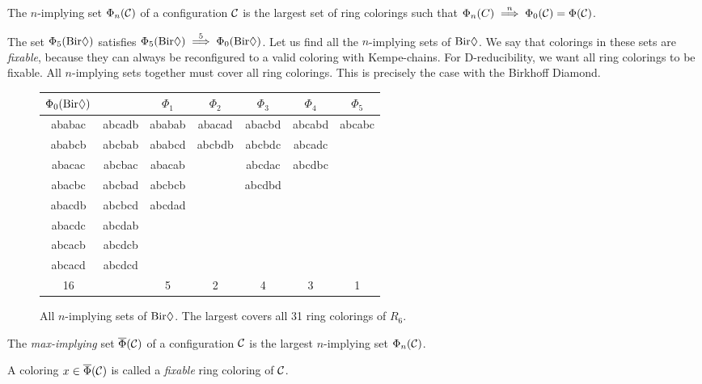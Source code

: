 \begin{definition}
    The $n$-implying set $\Phi_n(\mathcal{C})$ of a configuration $\mathcal{C}$ is the largest set of ring colorings such that $\Phi_n(C) \stackrel{n}{\implies} \Phi_0(\mathcal{C}) = \Phi(\mathcal{C})$. 
\end{definition}

The set $\Phi_5(\text{Bir}\Diamond)$ satisfies $\Phi_5(\text{Bir}\Diamond) \stackrel{5}{\implies} \Phi_0(\text{Bir}\Diamond)$. Let us find all the $n$-implying sets of $\text{Bir}\Diamond$. We say that colorings in these sets are \textit{fixable}, because they can always be reconfigured to a valid coloring with Kempe-chains. For D-reducibility, we want all ring colorings to be fixable. All $n$-implying sets together must cover all ring colorings. This is precisely the case with the Birkhoff Diamond.

\needspace{2cm}
\begin{figure}[!ht]
    \centering
    \begin{tabular}{ ccccccc }
        $\Phi_0(\text{Bir}\Diamond) $ & & $\Phi_1$ & $\Phi_2$ & $\Phi_3$ & $\Phi_4$ & $\Phi_5$ \\
        \hline
        ababac & abcadb & ababab & abacad & abacbd & abcabd & abcabc \\
        ababcb & abcbab & ababcd & abcbdb & abcbdc & abcadc & \\
        abacac & abcbac & abacab &        & abcdac & abcdbc & \\
        abacbc & abcbad & abcbcb &        & abcdbd &        & \\
        abacdb & abcbcd & abcdad &        &        &        & \\
        abacdc & abcdab \\
        abcacb & abcdcb \\
        abcacd & abcdcd \\
        \hline
        16 & & 5 & 2 & 4 & 3 & 1 \\
    \end{tabular}
    \caption{ All $n$-implying sets of $\text{Bir}\Diamond$. The largest covers all 31 ring colorings of $R_6$. }
    \label{table:diamondmap}
\end{figure}

\begin{definition}
    The \emph{max-implying} set $\overline{\Phi}(\mathcal{C})$ of a configuration $\mathcal{C}$ is the largest $n$-implying set  $\Phi_n(\mathcal{C})$.
\end{definition}

\begin{definition}
    A coloring $x \in \overline{\Phi}(\mathcal{C})$ is called a \emph{fixable} ring coloring of $\mathcal{C}$.
\end{definition}

